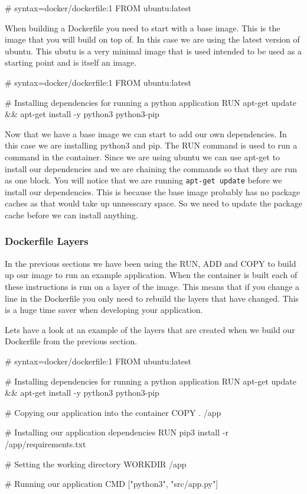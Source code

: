 \documentclass{csse4400}
\begin{document}
\begin{code}[language=docker,numbers=none]{}
# syntax=docker/dockerfile:1
FROM ubuntu:latest
\end{code}

When building a Dockerfile you need to start with a base image. This is the image that you will build on top of. In this case we are using the latest version of ubuntu. This ubutu is a very minimal image that is used intended to be used as a starting point and is itself an image.

\begin{code}[language=docker,numbers=none]{}
  # syntax=docker/dockerfile:1
  FROM ubuntu:latest

  # Installing dependencies for running a python application
  RUN apt-get update && apt-get install -y python3 python3-pip
\end{code}

Now that we have a base image we can start to add our own dependencies. In this case we are installing python3 and pip. The RUN command is used to run a command in the container. Since we are using ubuntu we can use apt-get to install our dependencies and we are chaining the commands so that they are run as one block. You will notice that we are running \texttt{apt-get update} before we install our dependencies. This is because the base image probably has no package caches as that would take up unnesscary space. So we need to update the package cache before we can install anything.


\subsubsection{Dockerfile Layers}

In the previous sections we have been using the RUN, ADD and COPY to build up our image to run an example application. When the container is built each of these instructions is run on a layer of the image. This means that if you change a line in the Dockerfile you only need to rebuild the layers that have changed. This is a huge time saver when developing your application.

Lets have a look at an example of the layers that are created when we build our Dockerfile from the previous section.

\begin{code}[language=docker,numbers=none]{}
  # syntax=docker/dockerfile:1
  FROM ubuntu:latest

  # Installing dependencies for running a python application
  RUN apt-get update && apt-get install -y python3 python3-pip

  # Copying our application into the container
  COPY . /app

  # Installing our application dependencies
  RUN pip3 install -r /app/requirements.txt

  # Setting the working directory
  WORKDIR /app

  # Running our application
  CMD ["python3", "src/app.py"]
\end{code}
\end{document}

